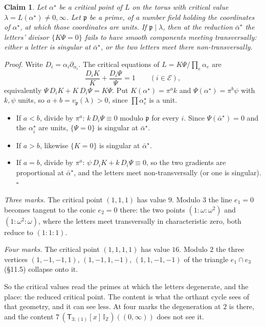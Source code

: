\documentclass[11pt]{article}
\newcommand{\cE}{\mathcal E}
\newcommand{\sT}{\mathsf T}
\newcommand{\IZ}{\mathbb I_{\mathbb Z}}
\newcommand{\Tx}[3]{(\sT_{#1;(1)}[x]\,#2)((#3,\infty))}
\theoremstyle{plain}
\newtheorem{claim}{Claim}[section]
\theoremstyle{remark}
\begin{document}
\begin{claim}\label{cl:criticalprime}
Let $\alpha^\star$ be a critical point of $L$ on the torus with critical value $\lambda=L(\alpha^\star)\neq0,\infty$. Let $\mathfrak p$ be a prime, of a number field holding the coordinates of $\alpha^\star$, at which those coordinates are units. If $\mathfrak p\mid\lambda$, then at the reduction $\bar\alpha^\star$ the letters' divisor $\{K\Psi=0\}$ fails to have smooth components meeting transversally: either a letter is singular at $\bar\alpha^\star$, or the two letters meet there non-transversally.
\end{claim}

\emph{Proof.} Write $D_i=\alpha_i\partial_{\alpha_i}$. The critical equations of $L=K\Psi/\prod_e\alpha_e$ are
\[
\frac{D_iK}K+\frac{D_i\Psi}\Psi=1\qquad(i\in\cE),
\]
equivalently $\Psi\,D_iK+K\,D_i\Psi=K\Psi$. Put $K(\alpha^\star)=\pi^ak$ and $\Psi(\alpha^\star)=\pi^b\psi$ with $k,\psi$ units, so $a+b=v_{\mathfrak p}(\lambda)>0$, since $\prod\alpha^\star_e$ is a unit.
\begin{itemize}
\item If $a<b$, divide by $\pi^a$: $k\,D_i\Psi\equiv0$ modulo $\mathfrak p$ for every $i$. Since $\Psi(\bar\alpha^\star)=0$ and the $\alpha^\star_i$ are units, $\{\Psi=0\}$ is singular at $\bar\alpha^\star$.
\item If $a>b$, likewise $\{K=0\}$ is singular at $\bar\alpha^\star$.
\item If $a=b$, divide by $\pi^a$: $\psi\,D_iK+k\,D_i\Psi\equiv0$, so the two gradients are proportional at $\bar\alpha^\star$, and the letters meet non-transversally (or one is singular). $\square$
\end{itemize}

\emph{Three marks.} The critical point $(1,1,1)$ has value $9$. Modulo $3$ the line $e_1=0$ becomes tangent to the conic $e_2=0$ there: the two points $(1:\omega:\omega^2)$ and $(1:\omega^2:\omega)$, where the letters meet transversally in characteristic zero, both reduce to $(1:1:1)$.

\emph{Four marks.} The critical point $(1,1,1,1)$ has value $16$. Modulo $2$ the three vertices $(1,-1,-1,1)$, $(1,-1,1,-1)$, $(1,1,-1,-1)$ of the triangle $e_1\cap e_3$ (\S11.5) collapse onto it.

So the critical values read the primes at which the letters degenerate, and the place: the reduced critical point. The content is what the orthant cycle sees of that geometry, and it can see less. At four marks the degeneration at $2$ is there, and the content $7\,\Tx3{\IZ}0$ does not see it.
\end{document}
